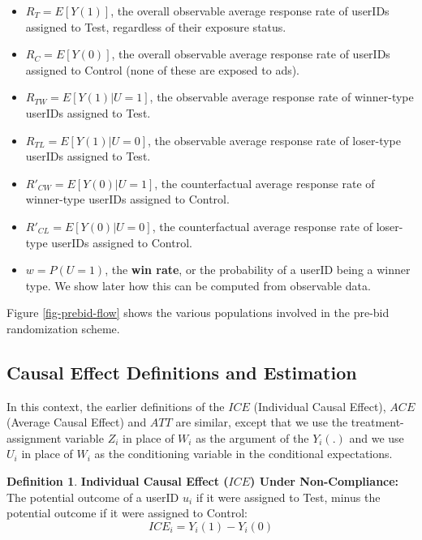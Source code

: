 \documentclass[11pt,a4paper]{article}
\theoremstyle{definition}
\newtheorem{definition}{Definition}[section]
\theoremstyle{remark}
\theoremstyle{definition}
\theoremstyle{definition}
\theoremstyle{definition}
\theoremstyle{definition}
\theoremstyle{definition}
\theoremstyle{definition}
\begin{document}
\begin{itemize}
	\item $R_T = E[Y(1)]$, the overall observable average response rate of userIDs assigned to Test, regardless of their exposure status.
	\item $R_C = E[Y(0)]$, the overall observable average response rate of userIDs assigned to Control (none of these are exposed to ads).
	\item $R_{TW} = E[Y(1) | U=1]$, the observable average response rate of winner-type userIDs assigned to Test.
	\item $R_{TL} = E[Y(1) | U=0]$, the observable average response rate of loser-type userIDs assigned to Test.
	\item $R'_{CW} = E[Y(0) | U=1]$, the counterfactual average response rate of winner-type userIDs assigned to Control.
	\item $R'_{CL} = E[Y(0) | U=0]$, the counterfactual average response rate of loser-type userIDs assigned to Control.
	\item $w = P(U=1)$, the \textbf{win rate}, or the probability of a userID being a winner type. We show later how this can be computed from observable data.
\end{itemize}

Figure \ref{fig-prebid-flow} shows the various populations involved in the pre-bid randomization scheme.

\subsection{Causal Effect Definitions and Estimation}\label{sec-causal-est}

In this context, the earlier definitions of the $ICE$ (Individual Causal Effect), $ACE$ (Average Causal Effect) and $ATT$ are similar, except that we use the treatment-assignment variable $Z_i$ in place of $W_i$ as the argument of the $Y_i(.)$ and we use $U_i$ in place of $W_i$ as the conditioning variable in the conditional expectations.

\begin{definition}\label{def-ice-noncomp}\small
	\textbf{Individual Causal Effect ($ICE$) Under Non-Compliance:} The potential outcome of a userID $u_i$ if it were assigned to Test, minus the potential outcome if it were assigned to Control:
\begin{equation}
ICE_i = Y_i(1) - Y_i(0) \label{eq-ice-noncomp}	
\end{equation}
\end{definition}
\end{document}
